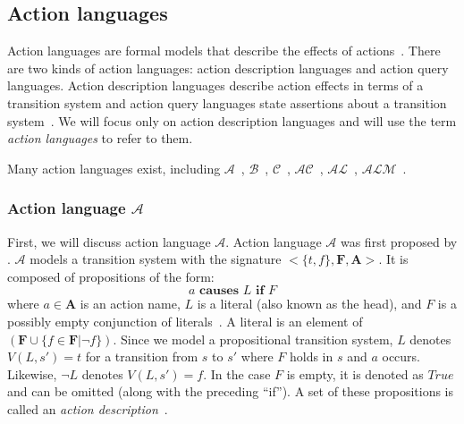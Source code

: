 \subsection{Action languages}
\label{subsec:action_languages}

Action languages are formal models that describe the effects of actions~\citep{gelfond_action_1998}.
There are two kinds of action languages: action description languages and action query languages.
Action description languages describe action effects in terms of a transition system and action query languages state assertions about a transition system~\citep{gelfond_action_1998}.
We will focus only on action description languages and will use the term \textit{action languages} to refer to them.

Many action languages exist, including $ \mathcal{A} $~\citep{gelfond_action_1998}, $ \mathcal{B} $~\citep{gelfond_action_1998}, $ \mathcal{C} $~\citep{gelfond_action_1998}, $ \mathcal{AC} $~\citep{turner_representing_1997}, $ \mathcal{AL} $~\citep{baral_reasoning_2000}, $ \mathcal{ALM} $~\citep{inclezan_modular_2016}.

\subsubsection{Action language $ \mathcal{A} $}
\label{subsubsec:action_language_a}

First, we will discuss action language $ \mathcal{A} $.
Action language $ \mathcal{A} $ was first proposed by \citet{pednault_formulating_1987}.
$ \mathcal{A} $ models a transition system with the signature $ <\{t, f\}, \boldsymbol{F}, \boldsymbol{A}> $.
It is composed of propositions of the form:
\begin{equation}
    a \textbf{ causes } L \textbf{ if } F
\end{equation}
where $ a \in \boldsymbol{A} $ is an action name, $ L $ is a literal (also known as the head), and $ F $ is a possibly empty conjunction of literals~\citep{gelfond_action_1998}.
A literal is an element of $(\boldsymbol{F} \cup \{f \in \boldsymbol{F} | \neg f\})$.
Since we model a propositional transition system, $L$ denotes $V(L, s') = t$ for a transition from $s$ to $s'$ where $F$ holds in $s$ and $a$ occurs.
Likewise, $\neg L$ denotes $V(L, s')=f$.
In the case $ F $ is empty, it is denoted as $ True $ and can be omitted (along with the preceding ``if'').
A set of these propositions is called an \textit{action description}~\citep{gelfond_action_1998}.

